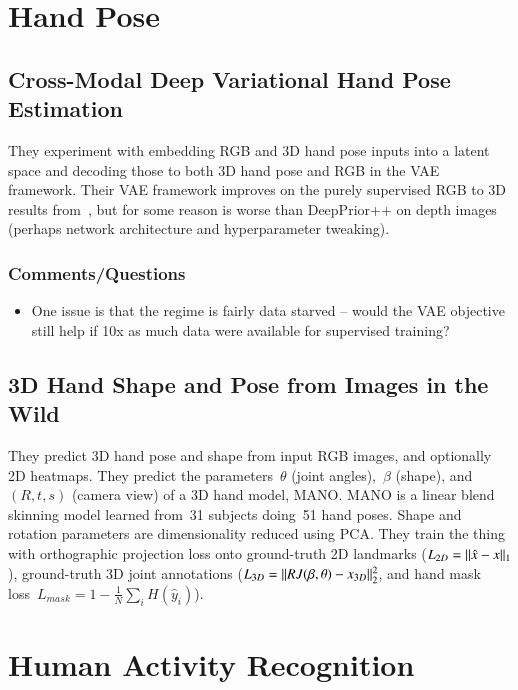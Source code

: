 \documentclass[a4paper, 12pt]{article}
\DeclarePairedDelimiter\norm{\lVert}{\rVert}%
\begin{document}
\section{Hand Pose}


\subsection{Cross-Modal Deep Variational Hand Pose
            Estimation~\cite{spurr2018crossmodal}}

They experiment with embedding RGB and 3D hand pose inputs into a latent space
and decoding those to both 3D hand pose and RGB in the VAE framework. Their VAE
framework improves on the purely supervised RGB to 3D results
from~\cite{zb2017hand}, but for some reason is worse than DeepPrior++ on depth
images (perhaps network architecture and hyperparameter tweaking).


\subsubsection{Comments/Questions}

\begin{itemize}
        \item One issue is that the regime is fairly data starved -- would the
                VAE objective still help if 10x as much data were available for
                supervised training?
\end{itemize}


\subsection{3D Hand Shape and Pose from Images in the
            Wild~\cite{boukhayma20193d}}

They predict 3D hand pose and shape from input RGB images, and optionally 2D
heatmaps.
They predict the parameters~$\theta$ (joint angles),~$\beta$ (shape),
and~$(R, t, s)$ (camera view) of a 3D hand model, MANO\@.
MANO is a linear blend skinning model learned from~\num{31} subjects
doing~\num{51} hand poses.
Shape and rotation parameters are dimensionality reduced using PCA\@.
They train the thing with orthographic projection loss onto ground-truth 2D
landmarks ($L_{2D} = \norm{\hat{x} - x}_1$), ground-truth 3D joint annotations
($L_{3D} = \norm{RJ(\beta, \theta) - x_{3D}}^2_2$, and hand mask
loss~$L_{mask} = 1 - \frac{1}{N}\sum_i H(\hat{y}_i)$).


\section{Human Activity Recognition}
\end{document}
